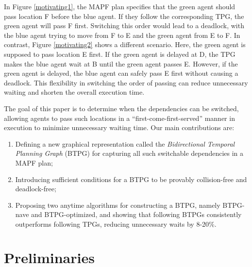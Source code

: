 \documentclass[letterpaper]{article} %
\theoremstyle{definition}
\newcommand{\rishi}[1]{\textcolor{black}{\textbf{Rishi:}} 
\textcolor{purple}{#1}}
\newcommand{\andrew}[1]{\textcolor{black}{\textbf{Yifan:}} \textcolor{blue}{#1}}
\begin{document}
In Figure \ref{motivating1}, the MAPF plan specifies that the green agent should pass location F before the blue agent. If they follow the corresponding TPG, the green agent will pass F first. Switching this order would lead to a deadlock, with the blue agent trying to move from F to E and the green agent from E to F.
In contrast, Figure \ref{motivating2} shows a different scenario. Here, the green agent is supposed to pass location E first. If the green agent is delayed at D, the TPG makes the blue agent wait at B until the green agent passes E. However, if the green agent is delayed, the blue agent can safely pass E first without causing a deadlock. This flexibility in switching the order of passing can reduce unnecessary waiting and shorten the overall execution time.


The goal of this paper is to determine when the dependencies can be switched, allowing agents to pass such locations in a ``first-come-first-served'' manner in execution to minimize unnecessary waiting time.  Our main contributions are:
\begin{enumerate}
    \item Defining a new graphical representation called the \emph{Bidirectional Temporal Planning Graph} (BTPG) for capturing all such switchable dependencies in a MAPF plan;
    \item Introducing sufficient conditions for a BTPG to be provably collision-free and deadlock-free;
    \item Proposing two anytime algorithms for constructing a BTPG, namely
    BTPG-nave and BTPG-optimized, and showing that following BTPGs consistently outperforms following TPGs, reducing unnecessary waits by 8-20\%.
\end{enumerate}



\section{Preliminaries}
\end{document}
